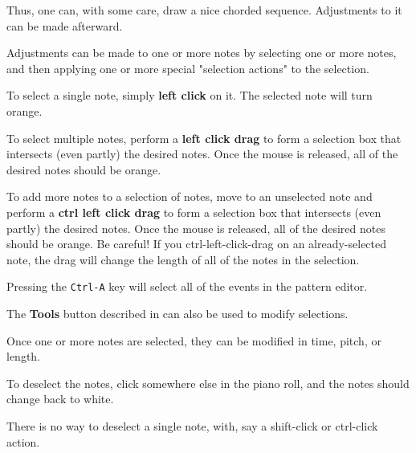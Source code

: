    Thus, one can, with some care, draw a nice chorded sequence.
   Adjustments to it can be made afterward.

   Adjustments can be made to one or more notes by selecting one or more notes,
   and then applying one or more special
    "selection actions" to the selection.

   To select a single note, simply \textbf{left click} on it.
   The selected note will turn orange.

   To select multiple notes, perform a \textbf{left click drag}
   to form a selection box that intersects (even partly) the desired notes.
   Once the mouse is released, all of the desired notes should be orange.

   To add more notes to a selection of notes, move to an unselected note
   and perform a \textbf{ctrl left click drag}
   to form a selection box that intersects (even partly) the desired notes.
   Once the mouse is released, all of the desired notes should be orange.
   Be careful!  If you ctrl-left-click-drag on an already-selected note,
   the drag will change the length of all of the notes in the selection.

   Pressing the \texttt{Ctrl-A} key will select all of the events in the
   pattern editor.

   The \textbf{Tools} button described in
    can also be used to
   modify selections.

   Once one or more notes are selected, they can be modified in time,
   pitch, or length.

   To deselect the notes, click somewhere else in the piano roll, and the notes
   should change back to white.

   There is no way to deselect a single note, with, say a shift-click
   or ctrl-click action.



